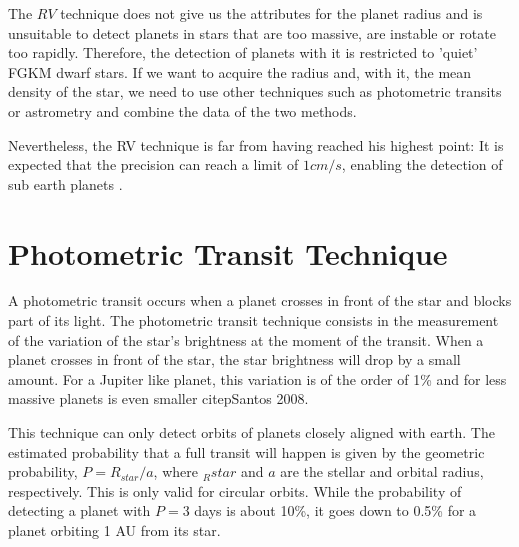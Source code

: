 \documentclass[dvips,12pt,a4paper]{report}
\begin{document}
The $RV$ technique does not give us the attributes for the planet radius and is unsuitable to detect planets in stars that are too massive, are instable or rotate too rapidly. Therefore, the detection of planets with it is restricted to 'quiet' FGKM dwarf stars. If we want to acquire the radius and, with it, the mean density of the star, we need to use other techniques such as photometric transits or astrometry and combine the data of the two methods.

Nevertheless, the RV technique is far from having reached his highest point: It is expected that the precision can reach a limit of $1cm/s$, enabling the detection of sub earth planets \citep{Lovis-2006b}. 




\section{Photometric Transit Technique}
\label{transit}
A photometric transit occurs when a planet crosses in front of the star and blocks part of its light. 
The photometric transit technique consists in the measurement of the variation of the star's brightness at the moment of the transit. When a planet crosses in front of the star, the star brightness will drop by a small amount. For a Jupiter like planet, this variation is of the order of 1\% and for less massive planets is even smaller citep{Santos 2008}. 

This technique can only detect orbits of planets closely aligned with earth. The estimated probability that a full transit will happen is given by the geometric probability, $P=R_{star}/a$, where $_R{star}$ and $a$ are the stellar and orbital radius, respectively. This is only valid for circular orbits. While the probability of detecting a planet with $P=3$ days is about 10\%, it goes down to 0.5\% for a planet orbiting 1 AU from its star.
\end{document}
